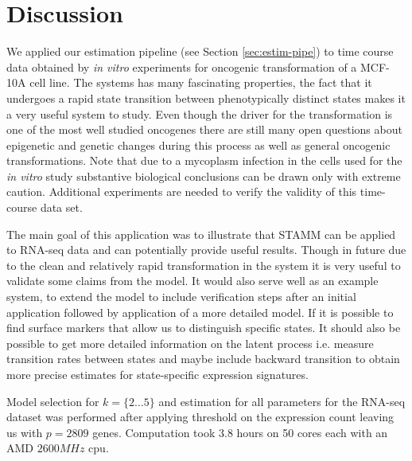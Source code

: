 \section{Discussion}
\label{sec:discussion-onco}

We applied our estimation pipeline (see Section \ref{sec:estim-pipe}) to time course data obtained by {\it in vitro} experiments for oncogenic transformation of a MCF-10A cell line. The systems has many fascinating properties, the fact that it undergoes a rapid state transition between phenotypically distinct states makes it a very useful system to study. Even though the driver for the transformation is one of the most well studied oncogenes there are still many open questions about epigenetic and genetic changes  during this process as well as general oncogenic transformations. Note that due to a mycoplasm infection in  the cells used for the {\it in vitro} study substantive  biological conclusions can be drawn only with extreme caution. Additional experiments are needed to verify the validity of this time-course data set.

The main goal of this application was to illustrate that STAMM can be applied to RNA-seq data and can potentially provide useful results. Though in future due to the clean and relatively rapid transformation in the system it is very useful to validate some claims from the model. It would also serve well as an example system, to extend the model to include verification steps after an initial application followed by application of a more detailed model. If it is possible to find surface markers that allow us to distinguish specific states. It should also be possible to get more detailed information on the latent process i.e. measure transition rates between states and maybe include backward transition to obtain more precise estimates for state-specific expression signatures.


Model selection for $k = \lbrace 2 \ldots 5 \rbrace$ and estimation for all parameters for the RNA-seq dataset was performed after applying threshold on the expression count leaving us with $p=2809$ genes. Computation took $3.8$ hours on 50 cores each with an AMD $2600MHz$ cpu.



